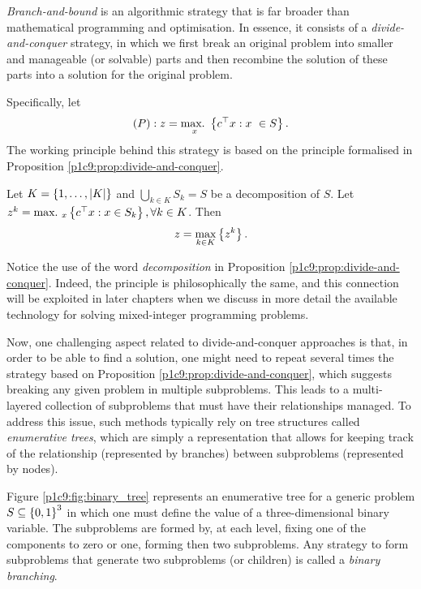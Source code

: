 \emph{Branch-and-bound} is an algorithmic strategy that is far broader than mathematical programming and optimisation. In essence, it consists of a \emph{divide-and-conquer} strategy, in which we first break an original problem into smaller and manageable (or solvable) parts and then recombine the solution of these parts into a solution for the original problem.

Specifically, let 
%
\begin{equation*}
	(P): z = \mathop{\text{max.~}}_x \left\{ c^\top x : x\ \in S \right \}. 
\end{equation*}
%
The working principle behind this strategy is based on the principle formalised in Proposition \ref{p1c9:prop:divide-and-conquer}.

\begin{proposition} \label{p1c9:prop:divide-and-conquer}
    Let $K = \left\{ 1,\dots,|K| \right \}$ and  $\bigcup_{k \in K} S_k = S$ be a decomposition of $S$. Let $z^k = \mathop{\text{max.~}}_x\left\{ c^\top x : x \in  S_k \right \}, \forall k \in K$. Then 
    \begin{equation*}
    	z = \max_{k \in K} \left\{ z^k \right \}.	
    \end{equation*}
\end{proposition}

Notice the use of the word \emph{decomposition} in Proposition \ref{p1c9:prop:divide-and-conquer}. Indeed, the principle is philosophically the same, and this connection will be exploited in later chapters when we discuss in more detail the available technology for solving mixed-integer programming problems.

Now, one challenging aspect related to divide-and-conquer approaches is that, in order to be able to find a solution, one might need to repeat several times the strategy based on Proposition \ref{p1c9:prop:divide-and-conquer}, which suggests breaking any given problem in multiple subproblems. This leads to a multi-layered collection of subproblems that must have their relationships managed. To address this issue, such methods typically rely on tree structures called \emph{enumerative trees}, which are simply a representation that allows for keeping track of the relationship (represented by branches) between subproblems (represented by nodes).

Figure \ref{p1c9:fig:binary_tree} represents an enumerative tree for a generic problem $S \subseteq \left\{ 0,1 \right \}^3$ in which one must define the value of a three-dimensional binary variable. The subproblems are formed by, at each level, fixing one of the components to zero or one, forming then two subproblems. Any strategy to form subproblems that generate two subproblems (or children) is called a \emph{binary branching}.


